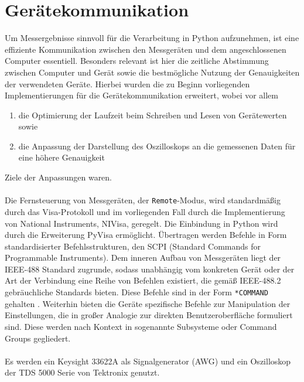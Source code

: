 \documentclass[../Report.tex]{subfiles}
\begin{document}
\chapter{Gerätekommunikation}
\label{sec:vorg.geraete}

Um Messergebnisse sinnvoll für die Verarbeitung in Python aufzunehmen, ist eine effiziente Kommunikation zwischen den Messgeräten und dem angeschlossenen Computer essentiell. Besonders relevant ist hier die zeitliche Abstimmung zwischen Computer und Gerät sowie die bestmögliche Nutzung der Genauigkeiten der verwendeten Geräte. 
Hierbei wurden die zu Beginn vorliegenden Implementierungen für die Gerätekommunikation erweitert, wobei vor allem
\begin{enumerate}
	\item die Optimierung der Laufzeit beim Schreiben und Lesen von Gerätewerten sowie
	\item die Anpassung der Darstellung des Oszilloskops an die gemessenen Daten für eine höhere Genauigkeit
\end{enumerate}
Ziele der Anpassungen waren.
\\
\\
Die Fernsteuerung von Messgeräten, der \lstinline{Remote}-Modus, wird standardmäßig durch das Visa-Protokoll und im vorliegenden Fall durch die Implementierung von National Instruments, NIVisa, geregelt. Die Einbindung in Python wird durch die Erweiterung PyVisa ermöglicht. Übertragen werden Befehle in Form standardisierter Befehlsstrukturen, den SCPI (Standard Commands for Programmable Instruments). Dem inneren Aufbau von Messgeräten liegt der IEEE-488 Standard zugrunde, sodass unabhängig vom konkreten Gerät oder der Art der Verbindung eine Reihe von Befehlen existiert, die gemäß IEEE-488.2 gebräuchliche Standards bieten. Diese Befehle sind in der Form \lstinline{*COMMAND} gehalten \cite[S. 224 ff.]{keysHand15}. 
Weiterhin bieten die Geräte spezifische Befehle zur Manipulation der Einstellungen, die in großer Analogie zur direkten Benutzeroberfläche formuliert sind. Diese werden nach Kontext in sogenannte Subsysteme oder Command Groups gegliedert.
\\
\\
\noindent
Es werden ein Keysight 33622A als Signalgenerator (AWG) und ein Oszilloskop der TDS 5000 Serie von Tektronix genutzt.
\end{document}
